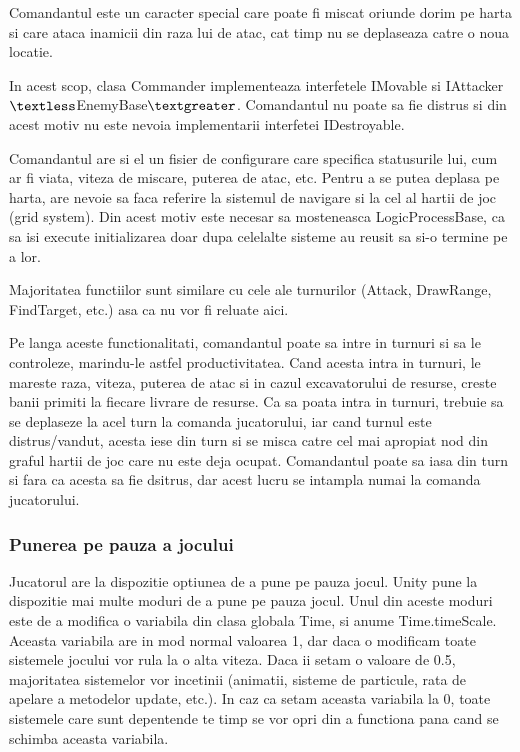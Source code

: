 \documentclass[12pt, a4paper]{article}
\begin{document}
	Comandantul este un caracter special care poate fi miscat oriunde dorim pe harta si care ataca inamicii din raza lui de atac, cat timp nu se deplaseaza catre o noua locatie.
	\newline
	
	In acest scop, clasa Commander implementeaza interfetele IMovable si IAttacker$\textless$EnemyBase$\textgreater$. Comandantul nu poate sa fie distrus si din acest motiv nu este nevoia implementarii interfetei IDestroyable.
	\newline
	
	Comandantul are si el un fisier de configurare care specifica statusurile lui, cum ar fi viata, viteza de miscare, puterea de atac, etc. Pentru a se putea deplasa pe harta, are nevoie sa faca referire la sistemul de navigare si la cel al hartii de joc (grid system). Din acest motiv este necesar sa mosteneasca LogicProcessBase, ca sa isi execute initializarea doar dupa celelalte sisteme au reusit sa si-o termine pe a lor.
	\newline
	
	Majoritatea functiilor sunt similare cu cele ale turnurilor (Attack, DrawRange, FindTarget, etc.) asa ca nu vor fi reluate aici. 
	\newline
	
	Pe langa aceste functionalitati, comandantul poate sa intre in turnuri si sa le controleze, marindu-le astfel productivitatea. Cand acesta intra in turnuri, le mareste raza, viteza, puterea de atac si in cazul excavatorului de resurse, creste banii primiti la fiecare livrare de resurse. Ca sa poata intra in turnuri, trebuie sa se deplaseze la acel turn la comanda jucatorului, iar cand turnul este distrus/vandut, acesta iese din turn si se misca catre cel mai apropiat nod din graful hartii de joc care nu este deja ocupat. Comandantul poate sa iasa din turn si fara ca acesta sa fie dsitrus, dar acest lucru se intampla numai la comanda jucatorului.
	
	
	
	
	
	\subsubsection{Punerea pe pauza a jocului}
	
	Jucatorul are la dispozitie optiunea de a pune pe pauza jocul. Unity pune la dispozitie mai multe moduri de a pune pe pauza jocul. Unul din aceste moduri este de a modifica o variabila din clasa globala Time, si anume Time.timeScale. Aceasta variabila are in mod normal valoarea 1, dar daca o modificam toate sistemele jocului vor rula la o alta viteza. Daca ii setam o valoare de 0.5, majoritatea sistemelor vor incetinii (animatii, sisteme de particule, rata de apelare a metodelor update, etc.). In caz ca setam aceasta variabila la 0, toate sistemele care sunt depentende te timp se vor opri din a functiona pana cand se schimba aceasta variabila. 
	\newline
	
\end{document}
